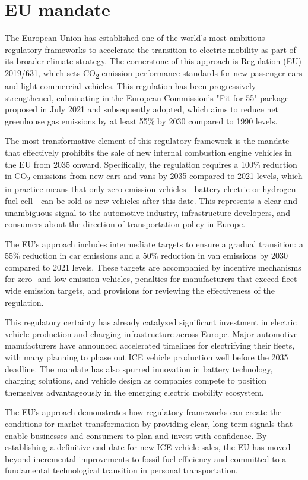\section{EU mandate}

The European Union has established one of the world's most ambitious regulatory frameworks to accelerate the transition to electric mobility as part of its broader climate strategy. The cornerstone of this approach is Regulation (EU) 2019/631, which sets CO\textsubscript{2} emission performance standards for new passenger cars and light commercial vehicles. This regulation has been progressively strengthened, culminating in the European Commission's "Fit for 55" package proposed in July 2021 and subsequently adopted, which aims to reduce net greenhouse gas emissions by at least 55\% by 2030 compared to 1990 levels.

The most transformative element of this regulatory framework is the mandate that effectively prohibits the sale of new internal combustion engine vehicles in the EU from 2035 onward. Specifically, the regulation requires a 100\% reduction in CO\textsubscript{2} emissions from new cars and vans by 2035 compared to 2021 levels, which in practice means that only zero-emission vehicles—battery electric or hydrogen fuel cell—can be sold as new vehicles after this date. This represents a clear and unambiguous signal to the automotive industry, infrastructure developers, and consumers about the direction of transportation policy in Europe.

The EU's approach includes intermediate targets to ensure a gradual transition: a 55\% reduction in car emissions and a 50\% reduction in van emissions by 2030 compared to 2021 levels. These targets are accompanied by incentive mechanisms for zero- and low-emission vehicles, penalties for manufacturers that exceed fleet-wide emission targets, and provisions for reviewing the effectiveness of the regulation.

This regulatory certainty has already catalyzed significant investment in electric vehicle production and charging infrastructure across Europe. Major automotive manufacturers have announced accelerated timelines for electrifying their fleets, with many planning to phase out ICE vehicle production well before the 2035 deadline. The mandate has also spurred innovation in battery technology, charging solutions, and vehicle design as companies compete to position themselves advantageously in the emerging electric mobility ecosystem.

The EU's approach demonstrates how regulatory frameworks can create the conditions for market transformation by providing clear, long-term signals that enable businesses and consumers to plan and invest with confidence. By establishing a definitive end date for new ICE vehicle sales, the EU has moved beyond incremental improvements to fossil fuel efficiency and committed to a fundamental technological transition in personal transportation.

